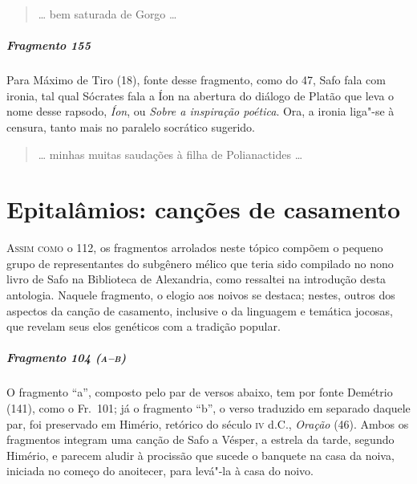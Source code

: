 \begin{verse}
\ldots{} bem saturada de Gorgo \ldots{}
\end{verse}

\paragraph{Fragmento 155}

{\small Para Máximo de Tiro (18), fonte desse fragmento, como do 47, Safo fala com ironia, tal qual
Sócrates fala a Íon na abertura do diálogo de Platão que leva o nome desse
rapsodo, \textit{Íon}, ou \textit{Sobre a inspiração poética}. Ora, a ironia
liga"-se à censura, tanto mais no paralelo socrático sugerido.}

\begin{verse}
\ldots{} minhas muitas saudações à filha de Polianactides \ldots{}
\end{verse}


\chapter[Epitalâmios: canções de casamento]{Epitalâmios: canções de casamento}


\textsc{Assim como} o 112, os fragmentos arrolados neste tópico compõem o pequeno grupo
de representantes do subgênero mélico que teria sido compilado no nono livro de
Safo na Biblioteca de Alexandria, como ressaltei na introdução desta antologia.
Naquele fragmento, o elogio aos noivos se destaca; nestes, outros dos aspectos
da canção de casamento, inclusive o da linguagem e temática jocosas, que
revelam seus elos genéticos com a tradição popular.

\paragraph{Fragmento 104 (\textsc{a--b})}

{\small O fragmento “a”, composto pelo par de versos abaixo, tem por fonte Demétrio (141),
como o Fr.~101; já o fragmento “b”, o verso traduzido em separado daquele par,
foi preservado em Himério, retórico do século \textsc{iv} d.C., \textit{Oração} (46).
Ambos os fragmentos integram uma canção de Safo a Vésper, a estrela da tarde,
segundo Himério, e parecem aludir à procissão que sucede o banquete na casa da
noiva, iniciada no começo do anoitecer, para levá"-la à casa do noivo.}

